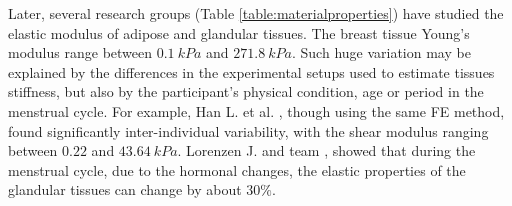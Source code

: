 Later, several research groups (Table \ref{table:materialproperties}) have studied the elastic modulus of adipose and glandular tissues. The breast tissue Young's modulus range between $0.1\ kPa$ and $271.8\ kPa$. Such huge variation may be explained by the differences in the experimental setups used to estimate tissues stiffness, but also by the participant's physical condition, age or period in the menstrual cycle. For example, Han L. et al. \citep{han_development_2012}, though using the same FE method, found significantly inter-individual variability, with the shear modulus ranging between $0.22$ and $43.64\ kPa$. Lorenzen J. and team \citep{lorenzen_menstrual-cycle_2003}, showed that during the menstrual cycle, due to the hormonal changes, the elastic properties of the glandular tissues can change by about $30\%$.

